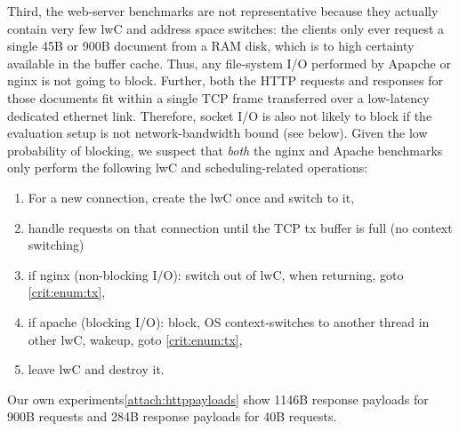 \documentclass[10pt,twocolumn,letter]{article}
\begin{document}
Third, the web-server benchmarks are not representative because they actually contain very few lwC and address space switches:
the clients only ever request a single 45B or 900B document from a RAM disk, which is to high certainty available in the buffer cache.
Thus, any file-system I/O performed by Apapche or nginx is not going to block.
Further, both the HTTP requests and responses for those documents fit within a single TCP frame transferred over a low-latency dedicated ethernet link.
Therefore, socket I/O is also not likely to block if the evaluation setup is not network-bandwidth bound (see below).
Given the low probability of blocking, we suspect that \textit{both} the nginx and Apache benchmarks only perform the following lwC and scheduling-related operations:
\begin{enumerate}[itemsep=0pt,parsep=0pt]
\item For a new connection, create the lwC once and switch to it,
\item\label{crit:enum:tx} handle requests on that connection until the TCP tx buffer is full (no context switching)
\item if nginx (non-blocking I/O): switch out of lwC, when returning, goto \ref{crit:enum:tx},
\item if apache (blocking I/O): block, OS context-switches to another thread in other lwC, wakeup, goto \ref{crit:enum:tx},
\item leave lwC and destroy it.
\end{enumerate}
Our own experiments\ref{attach:httppayloads} show 1146B response payloads for 900B requests and 284B response payloads for 40B requests.
\end{document}
